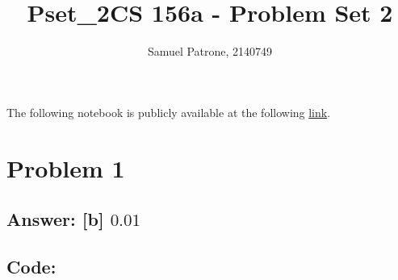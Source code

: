 \documentclass[11pt]{article}
\title{Pset\_2}
\begin{document}
    \title{CS 156a - Problem Set 2}
    \author{Samuel Patrone, 2140749}
    \maketitle
    

The following notebook is publicly available at the following
\href{https://github.com/spatrone/CS156A-Caltech.git}{link}.

\tableofcontents
    
    \hypertarget{problem-1}{%
\section{Problem 1}\label{problem-1}}

\hypertarget{answer-b-0.01}{%
\subsection{\texorpdfstring{Answer: {[}b{]}
\(0.01\)}{Answer: {[}b{]} 0.01}}\label{answer-b-0.01}}

\hypertarget{code}{%
\subsection{Code:}\label{code}}
\end{document}
